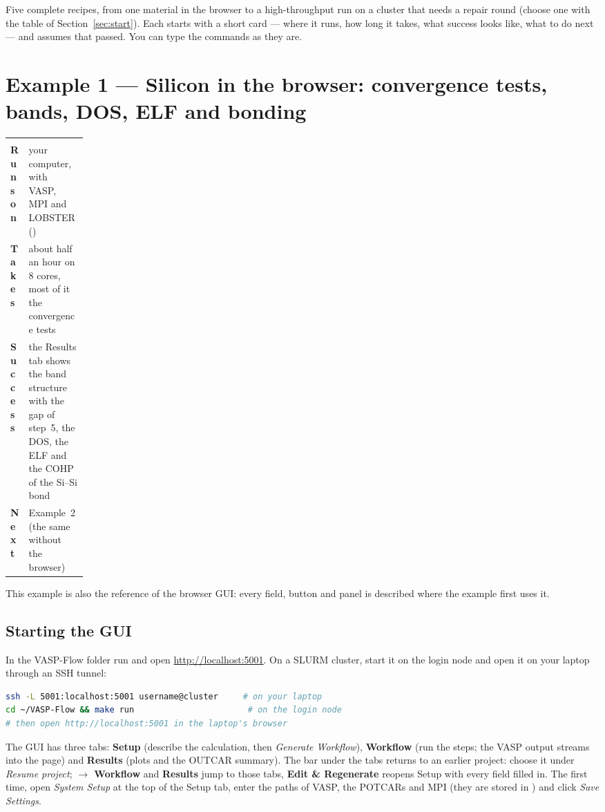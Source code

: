 \documentclass[11pt,a4paper]{scrartcl}
\makeatletter
\newcommand{\thead}{\rowcolor{lightblue}}
\newcommand{\cmd}[1]{\texttt{\detokenize{#1}}}
\newcommand{\taskcard}[4]{\par\noindent
  \begin{tabularx}{\linewidth}{@{}>{\raggedright\arraybackslash\bfseries}p{0.13\linewidth}>{\raggedright\arraybackslash}X@{}}
  \thead \multicolumn{2}{@{}l}{\textbf{At a glance}} \\ Runs on & #1 \\ Takes & #2 \\ Success & #3 \\ Next & #4 \\ \bottomrule
  \end{tabularx}\par\medskip}
\makeatother
\begin{document}
Five complete recipes, from one material in the browser to a high-throughput run on a
cluster that needs a repair round (choose one with the table of Section~\ref{sec:start}).
Each starts with a short card --- where it runs, how long it takes, what success looks like,
what to do next --- and assumes that \cmd{make check} passed.  You can type the commands as
they are.

\section{Example 1 --- Silicon in the browser: convergence tests, bands, DOS, ELF and bonding}
\label{sec:ex-gui}

\taskcard{your computer, with VASP, MPI and LOBSTER (\cmd{make check FOR="gui local"})}
  {about half an hour on 8 cores, most of it the convergence tests}
  {the Results tab shows the band structure with the gap of step~5, the DOS, the ELF and the
   COHP of the Si--Si bond}
  {Example~2 (the same without the browser)}

This example is also the reference of the browser GUI: every field, button and panel is
described where the example first uses it.

\subsection{Starting the GUI}
\label{sec:gui}

In the VASP-Flow folder run \cmd{make run} and open \url{http://localhost:5001}.  On a SLURM
cluster, start it on the login node and open it on your laptop through an SSH tunnel:
\begin{lstlisting}[language=bash]
ssh -L 5001:localhost:5001 username@cluster     # on your laptop
cd ~/VASP-Flow && make run                       # on the login node
# then open http://localhost:5001 in the laptop's browser
\end{lstlisting}
The GUI has three tabs: \textbf{Setup} (describe the calculation, then \emph{Generate
Workflow}), \textbf{Workflow} (run the steps; the VASP output streams into the page) and
\textbf{Results} (plots and the OUTCAR summary).  The bar under the tabs returns to an earlier
project: choose it under \emph{Resume project}; \textbf{$\to$ Workflow} and \textbf{Results}
jump to those tabs, \textbf{Edit \& Regenerate} reopens Setup with every field filled in.  The
first time, open \emph{System Setup} at the top of the Setup tab, enter the paths of VASP, the
POTCARs and MPI (they are stored in \cmd{settings.json}) and click \emph{Save Settings}.
\end{document}
